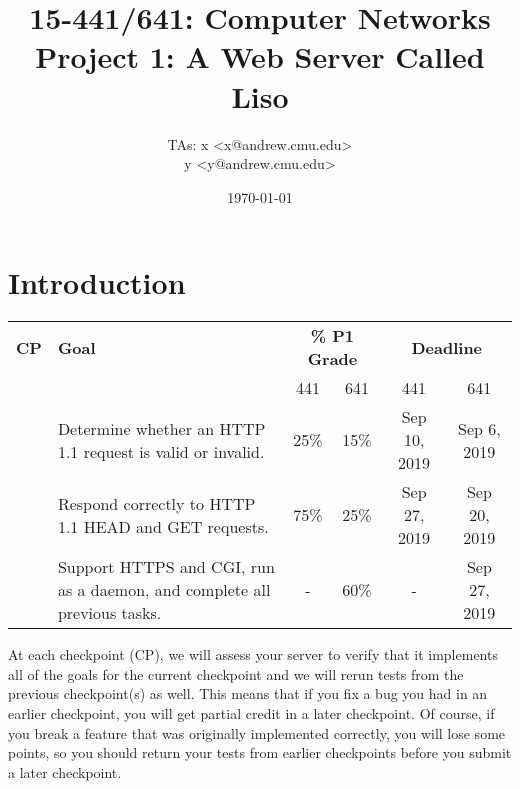 \documentclass{article}
\begin{document}
\title{	15-441/641: Computer Networks\\
Project 1: A Web Server Called Liso\\
}

\author{TAs: x <x@andrew.cmu.edu> \\
y <y@andrew.cmu.edu>}
\date{\today}

\maketitle


\section{Introduction}


\begin{center}
\vspace{10pt}
\begin{tabular}{cp{2.5in}cccc}
  {\bf CP}&{\bf Goal}&\multicolumn{2}{c}{{\bf \% P1 Grade}}&\multicolumn{2}{c}{{\bf Deadline}}\\
  & & 441 & 641 & 441 & 641 \\

  \hline
  
  \addlinespace[5pt]
  1&Determine whether an HTTP 1.1 request is valid or invalid. & 25\% & 15\% & Sep 10, 2019 & Sep 6, 2019 \\
  
  \addlinespace[5pt]
  2&Respond correctly to HTTP 1.1 HEAD and GET requests. & 75\% & 25\% & Sep 27, 2019 & Sep 20, 2019   \\
  
  \addlinespace[5pt]
  3&Support HTTPS and CGI, run as a daemon, and complete all previous tasks. & - & 60\% & - & Sep 27, 2019\\
\end{tabular}
\end{center}

\noindent At each checkpoint (CP), we will assess your server to
verify that it implements all of the goals for the current checkpoint
and we will rerun tests from the previous checkpoint(s) as well.  This
means that if you fix a bug you had in an earlier checkpoint, you will
get partial credit in a later checkpoint.  Of course, if you break a
feature that was originally implemented correctly, you will lose some
points, so you should return your tests from earlier checkpoints
before you submit a later checkpoint.  
\end{document}
